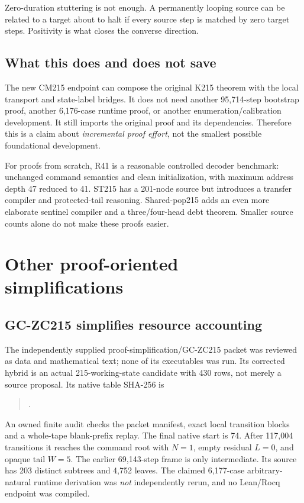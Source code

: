 \documentclass[11pt]{article}
\begin{document}
Zero-duration stuttering is not enough. A permanently looping source can be related to a target about to halt if every source step is matched by zero target steps. Positivity is what closes the converse direction.

\subsection{What this does and does not save}
The new CM215 endpoint can compose the original K215 theorem with the local transport and state-label bridges. It does not need another 95,714-step bootstrap proof, another 6,176-case runtime proof, or another enumeration/calibration development. It still imports the original proof and its dependencies. Therefore this is a claim about \emph{incremental proof effort}, not the smallest possible foundational development.

For proofs from scratch, R41 is a reasonable controlled decoder benchmark: unchanged command semantics and clean initialization, with maximum address depth 47 reduced to 41. ST215 has a 201-node source but introduces a transfer compiler and protected-tail reasoning. Shared-pop215 adds an even more elaborate sentinel compiler and a three/four-head debt theorem. Smaller source counts alone do not make these proofs easier.

\section{Other proof-oriented simplifications}
\subsection{GC-ZC215 simplifies resource accounting}
The independently supplied proof-simplification/GC-ZC215 packet was reviewed as data and mathematical text; none of its executables was run. Its corrected hybrid is an actual 215-working-state candidate with 430 rows, not merely a source proposal. Its native table SHA-256 is
\begin{quote}\small{}.\end{quote}
An owned finite audit checks the packet manifest, exact local transition blocks and a whole-tape blank-prefix replay. The final native start is 74. After 117,004 transitions it reaches the command root with $N=1$, empty residual $L=0$, and opaque tail $W=5$. The earlier 69,143-step frame is only intermediate. Its source has 203 distinct subtrees and 4,752 leaves. The claimed 6,177-case arbitrary-natural runtime derivation was \emph{not} independently rerun, and no Lean/Rocq endpoint was compiled.
\end{document}
